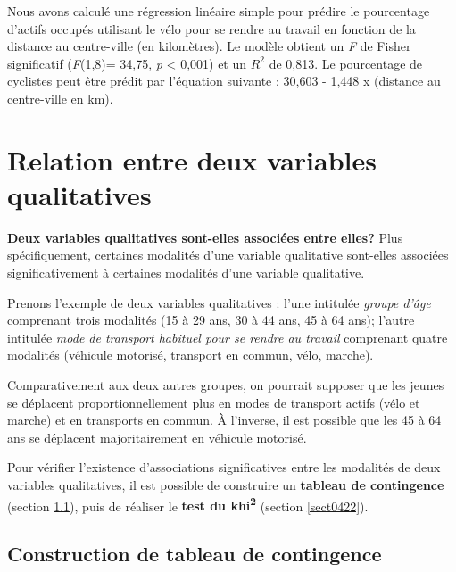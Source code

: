 \documentclass[
  11pt,
  french,
]{book}
\makeatletter
\newenvironment{kframev}{%
\medskip{}
\setlength{\fboxsep}{.8em}
 \def\at@end@of@kframev{}%
 \ifinner\ifhmode%
  \def\at@end@of@kframev{\end{minipage}}%
  \begin{minipage}{\columnwidth}%
 \fi\fi%
 \def\FrameCommand##1{\hskip\@totalleftmargin \hskip-\fboxsep
 \colorbox{shadebluecolor}{##1}\hskip-\fboxsep
     \hskip-\linewidth \hskip-\@totalleftmargin \hskip\columnwidth}%
 \MakeFramed {\advance\hsize-\width
   \@totalleftmargin\z@ \linewidth\hsize
   \@setminipage}}%
 {\par\unskip\endMakeFramed%
 \at@end@of@kframev}
\newenvironment{rmdblock}[1]
  {
  \begin{itemize}
  \renewcommand{\labelitemi}{
    \raisebox{-.7\height}[0pt][0pt]{
      {\setkeys{Gin}{width=3em,keepaspectratio}\texttt{[image: images/\#1]}}
    }
  }
  \setlength{\fboxsep}{1em}
  \begin{kframev}
  \small
  \item
  }
  {
  \end{kframev}
  \end{itemize}
  }
\newenvironment{bloc_objectif}
  {\begin{rmdblock}{objectif}}
  {\end{rmdblock}}
\makeatother
\begin{document}
Nous avons calculé une régression linéaire simple pour prédire le pourcentage d'actifs occupés utilisant le vélo pour se rendre au travail en fonction de la distance au centre-ville (en kilomètres). Le modèle obtient un \emph{F} de Fisher significatif (\emph{F}(1,8)= 34,75, \emph{p} \textless{} 0,001) et un \(R^2\) de 0,813. Le pourcentage de cyclistes peut être prédit par l'équation suivante : 30,603 - 1,448 x (distance au centre-ville en km).

\hypertarget{sect042}{%
\section{Relation entre deux variables qualitatives}\label{sect042}}

\begin{bloc_objectif}

\textbf{Deux variables qualitatives sont-elles associées entre elles?} Plus spécifiquement, certaines modalités d'une variable qualitative sont-elles associées significativement à certaines modalités d'une variable qualitative.

Prenons l'exemple de deux variables qualitatives : l'une intitulée \emph{groupe d'âge} comprenant trois modalités (15 à 29 ans, 30 à 44 ans, 45 à 64 ans); l'autre intitulée \emph{mode de transport habituel pour se rendre au travail} comprenant quatre modalités (véhicule motorisé, transport en commun, vélo, marche).

Comparativement aux deux autres groupes, on pourrait supposer que les jeunes se déplacent proportionnellement plus en modes de transport actifs (vélo et marche) et en transports en commun. À l'inverse, il est possible que les 45 à 64 ans se déplacent majoritairement en véhicule motorisé.

Pour vérifier l'existence d'associations significatives entre les modalités de deux variables qualitatives, il est possible de construire un \textbf{tableau de contingence} (section \ref{sect0421}), puis de réaliser le \textbf{test du khi\textsuperscript{2}} (section \ref{sect0422}).

\end{bloc_objectif}

\hypertarget{sect0421}{%
\subsection{Construction de tableau de contingence}\label{sect0421}}
\end{document}

